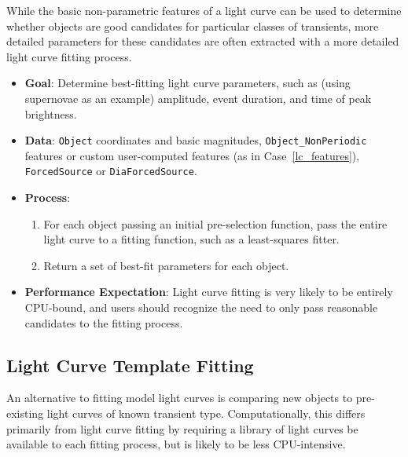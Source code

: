 \documentclass[DM,authoryear,toc]{lsstdoc}
\begin{document}
While the basic non-parametric features of a light curve can be used to
determine whether objects are good candidates for particular classes of
transients, more detailed parameters for these candidates are often extracted
with a more detailed light curve fitting process.

\begin{itemize}
  \item \textbf{Goal}: Determine best-fitting light curve parameters, such as
  (using supernovae as an example) amplitude, event duration, and time of peak brightness.
  \item \textbf{Data}: \texttt{Object} coordinates and basic magnitudes,
  \texttt{Object\_NonPeriodic} features or custom user-computed features (as in
  Case~\ref{lc_features}),
  \texttt{ForcedSource} or \texttt{DiaForcedSource}.
  \item \textbf{Process}:
    \begin{enumerate}
      \item For each object passing an initial pre-selection function, pass the
      entire light curve to a fitting function, such as a least-squares fitter.
      \item Return a set of best-fit parameters for each object.
    \end{enumerate}
  \item \textbf{Performance Expectation}: Light curve fitting is very likely to
  be entirely CPU-bound, and users should recognize the need to only pass
  reasonable candidates to the fitting process.
\end{itemize}

\subsection{Light Curve Template Fitting}

An alternative to fitting model light curves is comparing new objects to
pre-existing light curves of known transient type. Computationally, this differs
primarily from light curve fitting by requiring a library of light curves be
available to each fitting process, but is likely to be less CPU-intensive.
\end{document}
